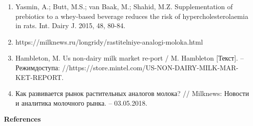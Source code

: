 \begin{enumerate}
\item
Yasmin, A.; Butt, M.S.; van Baak, M.; Shahid, M.Z. Supplementation of
prebiotics to a whey-based beverage reduces the risk of
hypercholesterolaemia in rats. Int. Dairy J. 2015, 48, 80-84.

\item
https://milknews.ru/longridy/rastitelniye-analogi-moloka.html

\item
Hambleton, M. Us non-dairy milk market re-port / M. Hambleton
{[}Текст{]}. -- Режимдоступа:
//https://store.mintel.com/US-NON-DAIRY-MILK-MAR-KET-REPORT.

\item
Как развивается рынок растительных аналогов молока? // Milknews:
Новости и аналитика молочного рынка. -- 03.05.2018.
\end{enumerate}

\begin{center}
{\bfseries References}
\end{center}

